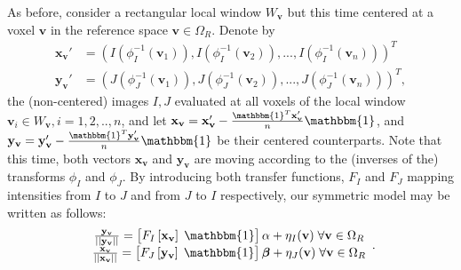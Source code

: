 
As before, consider a rectangular local window $W_{\mathbf{v}}$ but this time centered at a voxel $\mathbf{v}$ in the reference space $\mathbf{v}\in\Omega_{R}$. Denote by
\begin{align*}
    \mathbf{x}_{\mathbf{v}}' &= \left(I(\phi_{I}^{-1}(\mathbf{v}_{1})), I(\phi_{I}^{-1}(\mathbf{v}_{2})), ..., I(\phi_{I}^{-1}(\mathbf{v}_{n}))\right)^{T}\\
    \mathbf{y}_{\mathbf{v}}' &= \left(J(\phi_{J}^{-1}(\mathbf{v}_{1})), J(\phi_{J}^{-1}(\mathbf{v}_{2})), ..., J(\phi_{J}^{-1}(\mathbf{v}_{n}))\right)^{T},
\end{align*}
the (non-centered) images $I, J$ evaluated at all voxels of the local window $\mathbf{v}_{i}\in W_{\mathbf{v}}, i=1, 2, .., n$, and let $\mathbf{x}_{\mathbf{v}} = \mathbf{x}_{\mathbf{v}}' - \frac{\mathbbm{1}^{T}\mathbf{x}_{\mathbf{v}}'}{n}\mathbbm{1}$, and $\mathbf{y}_{\mathbf{v}} = \mathbf{y}_{\mathbf{v}}' - \frac{\mathbbm{1}^{T}\mathbf{y}_{\mathbf{v}}'}{n}\mathbbm{1}$ be their centered counterparts. Note that this time, both vectors $\mathbf{x}_{\mathbf{v}}$ and $\mathbf{y}_{\mathbf{v}}$ are moving according to the (inverses of the) transforms $\phi_{I}$ and $\phi_{J}$. By introducing both transfer functions, $F_{I}$ and $F_{J}$ mapping intensities from $I$ to $J$ and from $J$ to $I$ respectively, our symmetric model may be written as follows:
\begin{equation}\label{eq:symmetric_ecc_model}
    \begin{array}{ccccc}
        \frac{\mathbf{y}_{\mathbf{v}}}{||\mathbf{y}_{\mathbf{v}}||} = \left[F_{I}\left[\mathbf{x}_{\mathbf{v}}\right] \; \mathbbm{1}\right]\alpha + \eta_{I}(\mathbf{v}) \; \forall \mathbf{v}\in\Omega_{R}\\
        \frac{\mathbf{x}_{\mathbf{v}}}{||\mathbf{x}_{\mathbf{v}}||} = \left[F_{J}\left[\mathbf{y}_{\mathbf{v}}\right] \; \mathbbm{1}\right]\boldsymbol{\beta} + \eta_{J}(\mathbf{v}) \; \forall \mathbf{v}\in\Omega_{R}\\
    \end{array}.
\end{equation}

